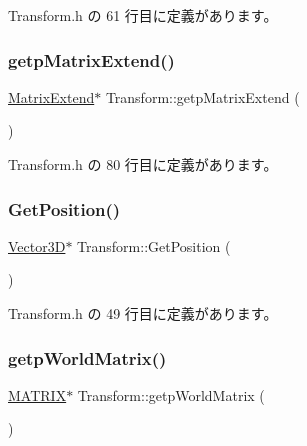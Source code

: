  Transform.\+h の 61 行目に定義があります。

\mbox{\label{class_transform_ac5a4f96871b6c1bfde9b2a6b7b0d6953}} 
\subsubsection{\texorpdfstring{getp\+Matrix\+Extend()}{getpMatrixExtend()}}
{\footnotesize\ttfamily \mbox{\hyperlink{class_matrix_extend}{Matrix\+Extend}}$\ast$ Transform\+::getp\+Matrix\+Extend (\begin{DoxyParamCaption}{ }\end{DoxyParamCaption})\hspace{0.3cm}{\ttfamily [inline]}}



 Transform.\+h の 80 行目に定義があります。

\mbox{\label{class_transform_addff6461a77b9f5c5249e46deb5c2c19}} 
\subsubsection{\texorpdfstring{Get\+Position()}{GetPosition()}}
{\footnotesize\ttfamily \mbox{\hyperlink{class_vector3_d}{Vector3D}}$\ast$ Transform\+::\+Get\+Position (\begin{DoxyParamCaption}{ }\end{DoxyParamCaption})\hspace{0.3cm}{\ttfamily [inline]}}



 Transform.\+h の 49 行目に定義があります。

\mbox{\label{class_transform_a19538fe991e76eb8146295e6f5f1ed99}} 
\subsubsection{\texorpdfstring{getp\+World\+Matrix()}{getpWorldMatrix()}}
{\footnotesize\ttfamily \mbox{\hyperlink{_vector3_d_8h_a032295cd9fb1b711757c90667278e744}{M\+A\+T\+R\+IX}}$\ast$ Transform\+::getp\+World\+Matrix (\begin{DoxyParamCaption}{ }\end{DoxyParamCaption})\hspace{0.3cm}{\ttfamily [inline]}}



